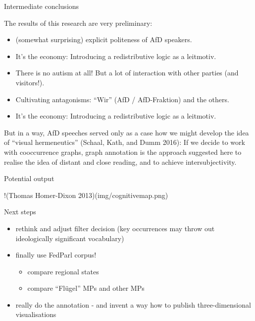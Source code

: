 \documentclass[
  ignorenonframetext,
]{beamer}
\providecommand{\tightlist}{%
  \setlength{\itemsep}{0pt}\setlength{\parskip}{0pt}}
\begin{document}
\begin{frame}{Intermediate conclusions}
\protect\hypertarget{intermediate-conclusions}{}

The results of this research are very preliminary:

\begin{itemize}
\item
  (somewhat surprising) explicit politeness of AfD speakers.
\item
  It's the economy: Introducing a redistributive logic as a leitmotiv.
\item
  There is no autism at all! But a lot of interaction with other parties
  (and visitors!).
\item
  Cultivating antagonisms: ``Wir'' (AfD / AfD-Fraktion) and the others.
\item
  It's the economy: Introducing a redistributive logic as a leitmotiv.
\end{itemize}

But in a way, AfD speeches served only as a case how we might develop
the idea of ``visual hermeneutics'' (Schaal, Kath, and Dumm 2016): If we
decide to work with cooccurrence graphs, graph annotation is the
approach suggested here to realise the idea of distant and close
reading, and to achieve intersubjectivity.

\end{frame}

\begin{frame}{Potential output}
\protect\hypertarget{potential-output}{}

!(Thomas Homer-Dixon 2013)(img/cognitivemap.png)

\end{frame}

\begin{frame}{Next steps}
\protect\hypertarget{next-steps}{}

\begin{itemize}
\item
  rethink and adjust filter decision (key occurrences may throw out
  ideologically significant vocabulary)
\item
  finally use FedParl corpus!

  \begin{itemize}
  \tightlist
  \item
    compare regional states
  \item
    compare ``Flügel'' MPs and other MPs
  \end{itemize}
\item
  really do the annotation - and invent a way how to publish
  three-dimensional visualisations
\end{itemize}

\end{frame}
\end{document}

